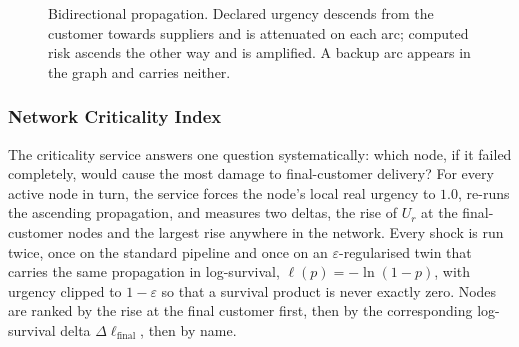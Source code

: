 \begin{figure}[htbp]
\centering
{}
\caption[Bidirectional urgency propagation on the DAG]{Bidirectional propagation. Declared
urgency descends from the customer towards suppliers and is attenuated on each arc; computed
risk ascends the other way and is amplified. A backup arc appears in the graph and carries
neither.}
\label{fig:urgency_propagation}
\end{figure}

\subsubsection{Network Criticality Index}
\label{sec:criticality}

The criticality service answers one question systematically: which node, if it failed
completely, would cause the most damage to final-customer delivery? For every active node
in turn, the service forces the node's local real urgency to $1.0$, re-runs the ascending
propagation, and measures two deltas, the rise of $U_r$ at the final-customer nodes and the
largest rise anywhere in the network. Every shock is run twice, once on the standard
pipeline and once on an $\varepsilon$-regularised twin that carries the same propagation in
log-survival, $\ell(p) = -\ln(1-p)$, with urgency clipped to $1-\varepsilon$ so that a
survival product is never exactly zero. Nodes are ranked by the rise at the final customer
first, then by the corresponding log-survival delta $\Delta \ell_{\text{final}}$, then by
name. 

